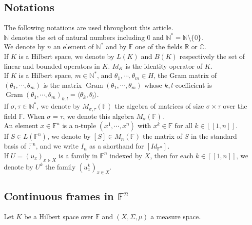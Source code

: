 \documentclass[a4paper,12pt]{article}
\DeclareMathOperator{\Gram}{Gram}
\theoremstyle{plain}
\theoremstyle{definition}
\theoremstyle{remark}
\begin{document}
\subsection{Notations}
\label{SubsectionNotation}

The following notations are used throughout this article. \\
$\mathbb{N}$ denotes the set of natural numbers including 0 and $\mathbb{N}^* = \mathbb{N} \setminus \{0\}$. \\
We denote by $n$ an element of $\mathbb{N}^*$ and by $\mathbb{F}$ one of the fields $\mathbb{R}$ or $\mathbb{C}$. \\
If $K$ is a Hilbert space, we denote by $L(K)$ and $B(K)$ respectively the set of linear and bounded operators in $K$. $Id_K$ is the identity operator of $K$. \\
If $K$ is a Hilbert space, $m \in \mathbb{N}^*$, and $\theta_1, \cdots, \theta_m \in H$, the Gram matrix of $(\theta_1, \cdots, \theta_m)$ is the matrix $\Gram(\theta_1, \cdots, \theta_m)$ whose $k,l$-coefficient is $\Gram(\theta_1, \cdots, \theta_m)_{k,l} = \langle \theta_k, \theta_l \rangle$. \\
If $\sigma, \tau \in \mathbb{N}^*$, we denote by $M_{\sigma, \tau}(\mathbb{F})$ the algebra of matrices of size $\sigma \times \tau$ over the field $\mathbb{F}$. When $\sigma = \tau$, we denote this algebra $M_\sigma(\mathbb{F})$. \\
An element $x \in \mathbb{F}^n$ is a n-tuple $(x^1, \cdots, x^n)$ with $x^k \in \mathbb{F}$ for all $k \in [\![1,n]\!]$. \\
If $S \in L(\mathbb{F}^n)$, we denote by $[S] \in M_n(\mathbb{F})$ the matrix of $S$ in the standard basis of $\mathbb{F}^n$, and we write $I_n$ as a shorthand for $[Id_{\mathbb{F}^n}]$. \\
If $U = (u_x)_{x \in X}$ is a family in $\mathbb{F}^n$ indexed by $X$, then for each $k \in [\![1,n]\!]$, we denote by $U^k$ the family $(u_x^k)_{x \in X}$.

\subsection{Continuous frames in \texorpdfstring{$\mathbb{F}^n$}{Fn}}
\label{SubSectionFramesInFiniteDimension}

Let $K$ be a Hilbert space over $\mathbb{F}$ and $(X,\Sigma,\mu)$ a measure space.
\end{document}
